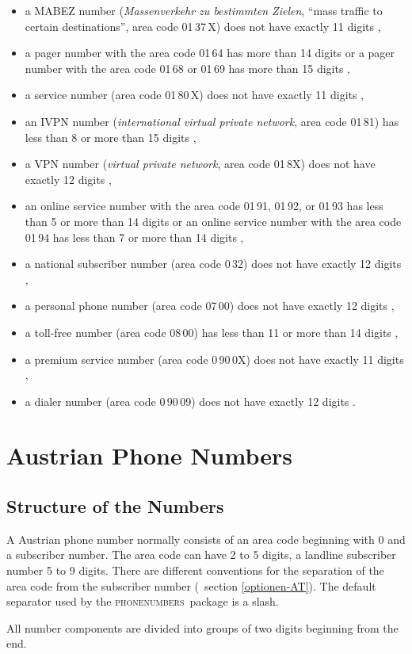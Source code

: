 \documentclass[numbers=noenddot]{scrreprt}
\newcommand*{\Paket}[1]{\textsc{#1}}
\newcommand{\phone}{\textcolor{cnltx}{\Paket{phone\-numbers}}}
\newcommand{\UeberschriftAufbau}{\section{Structure of the Numbers}}
\newcommand*{\vglAbschnitt}[1]{(\cf\ section \ref{#1})}
\newcommand*{\AufbauDEATA}[6]{A #1 phone number normally consists of an area code beginning with 0 and a subscriber number. The area code can have #2 to #3 digits, a landline subscriber number #4 to #5 digits. There are different conventions for the separation of the area code from the subscriber number
\vglAbschnitt{#6}.
The default separator used by the \phone\ package is a slash.}
\begin{document}
\begin{itemize}
\item a MABEZ number (\emph{Massenverkehr zu bestimmten Zielen}, \enquote{mass traffic to certain destinations}, area code 01\,37\,X) does not have exactly 11 digits \cite[2]{BNA-mabez},
\item a pager number with the area code 01\,64 has more than 14 digits or a pager number with the area code 01\,68 or 01\,69 has more than 15 digits \cite[2]{BNA-nummernplan},
\item a service number (area code 01\,80\,X) does not have exactly 11 digits \cite[71]{BNA-konzept},
\item an IVPN number (\emph{international virtual private network}, area code 01\,81) has less than 8 or more than 15 digits \cite[55]{BNA-konzept},
\item a VPN number (\emph{virtual private network}, area code 01\,8X) does not have exactly 12 digits \cite[53]{BNA-konzept},
\item an online service number with the area code 01\,91, 01\,92, or 01\,93 has less than 5 or more than 14 digits or an online service number with the area code 01\,94 has less than 7 or more than 14 digits \cite[\ppno\ 1 and 4]{BNA-019},
\item a national subscriber number (area code 0\,32) does not have exactly 12 digits \cite[45]{BNA-konzept},
\item a personal phone number (area code 07\,00) does not have exactly 12 digits \cite[74]{BNA-konzept},
\item a toll-free number (area code 08\,00) has less than 11 or more than 14 digits \cite[\ppno\ 1 and 5\psq]{BNA-0800},
\item a premium service number (area code 0\,90\,0X) does not have exactly 11 digits \cite[76]{BNA-konzept},
\item a dialer number (area code 0\,90\,09) does not have exactly 12 digits \cite[78]{BNA-konzept}.
\end{itemize}

\chapter{Austrian Phone Numbers}
\UeberschriftAufbau
\AufbauDEATA{Austrian}{2}{5}{5}{9}{optionen-AT}

All number components are divided into groups of two digits beginning from the end.
\begin{sidebyside}
\end{sidebyside}
\end{document}
